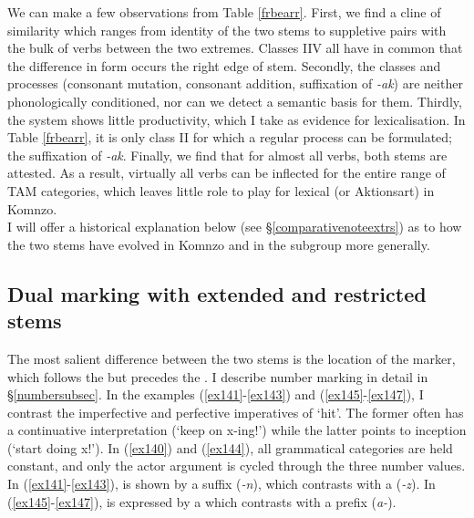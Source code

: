 We can make a few observations from Table \ref{frbearr}. First, we find a cline of similarity which ranges from identity of the two stems to suppletive pairs with the bulk of verbs between the two extremes. Classes II\textendash{}V all have in common that the difference in form occurs the right edge of stem. Secondly, the classes and processes (consonant mutation, consonant addition, suffixation of \emph{-ak}) are neither phonologically conditioned, nor can we detect a semantic basis for them. Thirdly, the system shows little productivity, which I take as evidence for lexicalisation. In Table \ref{frbearr}, it is only class II for which a regular process can be formulated; the suffixation of \emph{-ak}. Finally, we find that for almost all verbs, both stems are attested. As a result, virtually all verbs can be inflected for the entire range of TAM categories, which leaves little role to play for lexical  (or Aktionsart) in Komnzo.\\

I will offer a historical explanation below (see \S{}\ref{comparativenoteextrs}) as to how the two stems have evolved in Komnzo and in the  subgroup more generally.

\subsection{Dual marking with extended and restricted stems} \label{dualextrs}

The most salient difference between the two stems is the location of the  marker, which follows the  but precedes the . I describe number marking in detail in \S{}\ref{numbersubsec}. In the examples (\ref{ex141}-\ref{ex143}) and (\ref{ex145}-\ref{ex147}), I contrast the imperfective and perfective imperatives of `hit'. The former often has a continuative interpretation (`keep on x-ing!') while the latter points to inception (`start doing x!'). In (\ref{ex140}) and (\ref{ex144}), all grammatical categories are held constant, and only the actor argument is cycled through the three number values. In (\ref{ex141}-\ref{ex143}),  is shown by a suffix (\emph{-n}), which contrasts with a  (\emph{-z}). In (\ref{ex145}-\ref{ex147}),  is expressed by a  which contrasts with a  prefix (\emph{a-}).

